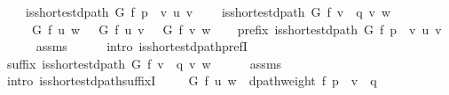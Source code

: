 \begin{isabellebody}
\ \ \ \ {\isachardoublequoteopen}is{\isacharunderscore}{\kern0pt}shortest{\isacharunderscore}{\kern0pt}dpath\ G\ f\ {\isacharparenleft}{\kern0pt}p\ {\isacharat}{\kern0pt}\ {\isacharbrackleft}{\kern0pt}v{\isacharbrackright}{\kern0pt}{\isacharparenright}{\kern0pt}\ u\ v{\isachardoublequoteclose}\isanewline
\ \ \ \ {\isachardoublequoteopen}is{\isacharunderscore}{\kern0pt}shortest{\isacharunderscore}{\kern0pt}dpath\ G\ f\ {\isacharparenleft}{\kern0pt}v\ {\isacharhash}{\kern0pt}\ q{\isacharparenright}{\kern0pt}\ v\ w{\isachardoublequoteclose}\isanewline
\ \ \ \ {\isachardoublequoteopen}{\isasymdelta}\ G\ f\ u\ w\ {\isacharequal}{\kern0pt}\ {\isasymdelta}\ G\ f\ u\ v\ {\isacharplus}{\kern0pt}\ {\isasymdelta}\ G\ f\ v\ w{\isachardoublequoteclose}%
\endisataginvisible
{\isafoldinvisible}%
%
\isadeliminvisible
\isanewline
%
\endisadeliminvisible
%
\isadelimproof
%
\endisadelimproof
%
\isatagproof
{}\isamarkupfalse%
\isanewline
\ \ \isamarkupfalse%
\ prefix{\isacharcolon}{\kern0pt}\ {\isachardoublequoteopen}is{\isacharunderscore}{\kern0pt}shortest{\isacharunderscore}{\kern0pt}dpath\ G\ f\ {\isacharparenleft}{\kern0pt}p\ {\isacharat}{\kern0pt}\ {\isacharbrackleft}{\kern0pt}v{\isacharbrackright}{\kern0pt}{\isacharparenright}{\kern0pt}\ u\ v{\isachardoublequoteclose}\isanewline
\ \ \ \ \isamarkupfalse%
\ assms\isanewline
\ \ \ \ \isamarkupfalse%
\ {\isacharparenleft}{\kern0pt}intro\ is{\isacharunderscore}{\kern0pt}shortest{\isacharunderscore}{\kern0pt}dpath{\isacharunderscore}{\kern0pt}prefI{\isacharparenright}{\kern0pt}\isanewline
\ \ \isamarkupfalse%
\ suffix{\isacharcolon}{\kern0pt}\ {\isachardoublequoteopen}is{\isacharunderscore}{\kern0pt}shortest{\isacharunderscore}{\kern0pt}dpath\ G\ f\ {\isacharparenleft}{\kern0pt}v\ {\isacharhash}{\kern0pt}\ q{\isacharparenright}{\kern0pt}\ v\ w{\isachardoublequoteclose}\isanewline
\ \ \ \ \isamarkupfalse%
\ assms\isanewline
\ \ \ \ \isamarkupfalse%
\ {\isacharparenleft}{\kern0pt}intro\ is{\isacharunderscore}{\kern0pt}shortest{\isacharunderscore}{\kern0pt}dpath{\isacharunderscore}{\kern0pt}suffixI{\isacharparenright}{\kern0pt}\isanewline
\ \ \isamarkupfalse%
\ {\isachardoublequoteopen}{\isasymdelta}\ G\ f\ u\ w\ {\isacharequal}{\kern0pt}\ dpath{\isacharunderscore}{\kern0pt}weight\ f\ {\isacharparenleft}{\kern0pt}p\ {\isacharat}{\kern0pt}\ {\isacharbrackleft}{\kern0pt}v{\isacharbrackright}{\kern0pt}\ {\isacharat}{\kern0pt}\ q{\isacharparenright}{\kern0pt}{\isachardoublequoteclose}\isanewline
\ \ \ \ \isamarkupfalse%

\end{isabellebody}
